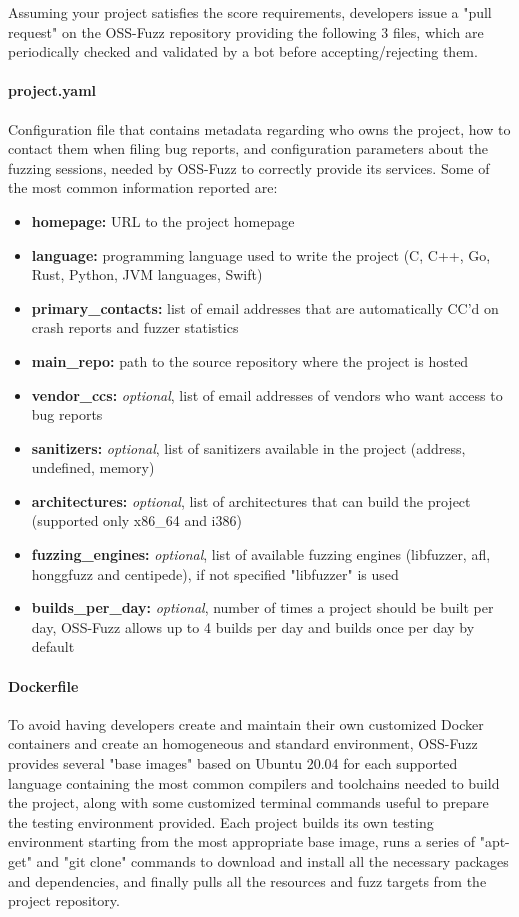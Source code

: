 \newpage
Assuming your project satisfies the score requirements, developers issue a "pull request" on the OSS-Fuzz repository providing the following 3 files, which are periodically checked and validated by a bot before accepting/rejecting them.

\paragraph{project.yaml} Configuration file that contains metadata regarding who owns the project, how to contact them when filing bug reports, and configuration parameters about the fuzzing sessions, needed by OSS-Fuzz to correctly provide its services.
Some of the most common information reported are:
\begin{itemize}
    \item \textbf{homepage:} URL to the project homepage
    \item \textbf{language:} programming language used to write the project (C, C++, Go, Rust, Python, JVM languages, Swift)
    \item \textbf{primary\_contacts:} list of email addresses that are automatically CC'd on crash reports and fuzzer statistics
    \item \textbf{main\_repo:} path to the source repository where the project is hosted
    \item \textbf{vendor\_ccs:} \textit{optional}, list of email addresses of vendors who want access to bug reports
    \item \textbf{sanitizers:} \textit{optional}, list of sanitizers available in the project (address, undefined, memory)
    \item \textbf{architectures:} \textit{optional}, list of architectures that can build the project (supported only x86\_64 and i386)
    \item \textbf{fuzzing\_engines:} \textit{optional}, list of available fuzzing engines (libfuzzer, afl, honggfuzz and centipede), if not specified "libfuzzer" is used
    \item \textbf{builds\_per\_day:} \textit{optional}, number of times a project should be built per day, OSS-Fuzz allows up to 4 builds per day and builds once per day by default
\end{itemize}

\paragraph{Dockerfile} To avoid having developers create and maintain their own customized Docker containers and create an homogeneous and standard environment, OSS-Fuzz provides several "base images" based on Ubuntu 20.04 for each supported language containing the most common compilers and toolchains needed to build the project, along with some customized terminal commands useful to prepare the testing environment provided. Each project builds its own testing environment starting from the most appropriate base image, runs a series of "apt-get" and "git clone" commands to download and install all the necessary packages and dependencies, and finally pulls all the resources and fuzz targets from the project repository.

